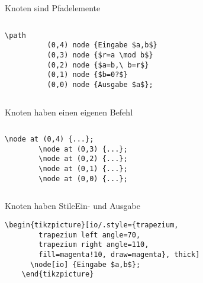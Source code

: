 \begin{Frame}[fragile]{Knoten sind Pfadelemente}
  \begin{columns}
    \column{30mm}
    \column{58mm}
      \begin{lstlisting}[gobble=8]
        \path
          (0,4) node {Eingabe $a,b$}
          (0,3) node {$r=a \mod b$}
          (0,2) node {$a=b,\ b=r$}
          (0,1) node {$b=0?$}
          (0,0) node {Ausgabe $a$};
      \end{lstlisting}
  \end{columns}
\end{Frame}

\begin{Frame}[fragile]{Knoten haben einen eigenen Befehl}
  \begin{columns}
    \column{30mm}
    \column{58mm}
      \begin{lstlisting}[gobble=8]
        \node at (0,4) {...};
        \node at (0,3) {...};
        \node at (0,2) {...};
        \node at (0,1) {...};
        \node at (0,0) {...};
      \end{lstlisting}
  \end{columns}
\end{Frame}

\begin{Frame}[fragile]{Knoten haben Stile}{Ein- und Ausgabe}

  \xxx

  \begin{lstlisting}[gobble=4]
    \begin{tikzpicture}[io/.style={trapezium,
        trapezium left angle=70,
        trapezium right angle=110,
        fill=magenta!10, draw=magenta}, thick]
      \node[io] {Eingabe $a,b$};
    \end{tikzpicture}
  \end{lstlisting}
\end{Frame}

